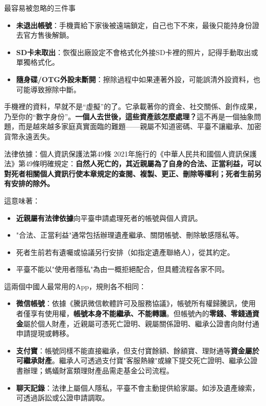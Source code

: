 \begin{tcbwarn}{最容易被忽略的三件事}
\begin{itemize}
  \item \textbf{未退出帳號}：手機賣給下家後被遠端鎖定，自己也下不來，最後只能持身份證去官方售後解鎖。
  \item \textbf{SD卡未取出}：恢復出廠設定不會格式化外接SD卡裡的照片，記得手動取出或單獨格式化。
  \item \textbf{隨身碟/OTG外設未斷開}：擦除過程中如果連著外設，可能誤清外設資料，也可能導致擦除中斷。
\end{itemize}

\end{tcbwarn}


手機裡的資料，早就不是“虛擬”的了。它承載著你的資金、社交關係、創作成果，乃至你的“數字身份”。\textbf{一個人去世後，這些資產該怎麼處理？}這不再是一個抽象問題，而是越來越多家庭真實面臨的難題——親屬不知道密碼、平臺不讓繼承、加密貨幣永遠丟失。

\begin{tcbinfo}{法律依據：個人資訊保護法第49條}
2021年施行的《中華人民共和國個人資訊保護法》第49條明確規定：\textbf{自然人死亡的，其近親屬為了自身的合法、正當利益，可以對死者相關個人資訊行使本章規定的查閱、複製、更正、刪除等權利；死者生前另有安排的除外。}

這意味著：

\begin{itemize}
  \item \textbf{近親屬有法律依據}向平臺申請處理死者的帳號與個人資訊。
  \item "合法、正當利益"通常包括辦理遺產繼承、關閉帳號、刪除敏感隱私等。
  \item 死者生前若有遺囑或協議另行安排（如指定遺產聯絡人），從其約定。
  \item 平臺不能以"使用者隱私"為由一概拒絕配合，但具體流程各家不同。
\end{itemize}

\end{tcbinfo}


這兩個中國人最常用的App，規則各不相同：

\begin{itemize}
  \item \textbf{微信帳號}：依據《騰訊微信軟體許可及服務協議》，帳號所有權歸騰訊，使用者僅享有使用權，\textbf{帳號本身不能繼承、不能轉讓}。但帳號內的\textbf{零錢、零錢通資金}屬於個人財產，近親屬可憑死亡證明、親屬關係證明、繼承公證書向財付通申請提現或轉移。
  \item \textbf{支付寶}：帳號同樣不能直接繼承，但支付寶餘額、餘額寶、理財通等\textbf{資金屬於可繼承財產}。繼承人可透過支付寶"客服熱線"或線下提交死亡證明、繼承公證書辦理；螞蟻財富類理財產品需走基金公司流程。
  \item \textbf{聊天記錄}：法律上屬個人隱私，平臺不會主動提供給家屬。如涉及遺產線索，可透過訴訟或公證申請調取。
\end{itemize}

